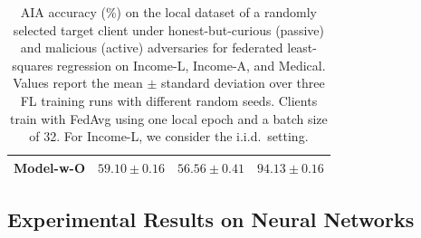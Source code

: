 \begin{table}[t]
\begin{tabular}{@{}lccc@{}}
        \midrule
        Model-w-O      & $59.10 \pm 0.16$          & $56.56 \pm 0.41$          & $94.13 \pm 0.16$ \\
        \bottomrule
    \end{tabular}
    \caption{AIA accuracy (\%) on the local dataset of a randomly selected target client under honest-but-curious (passive) and malicious (active) adversaries for federated least-squares regression on Income-L, Income-A, and Medical. Values report the mean $\pm$ standard deviation over three FL training runs with different random seeds. Clients train with FedAvg using one local epoch and a batch size of 32. For Income-L, we consider the i.i.d.\ setting.}
    \label{tab:attack_linear}
\end{table}


\subsection{Experimental Results on Neural Networks}

